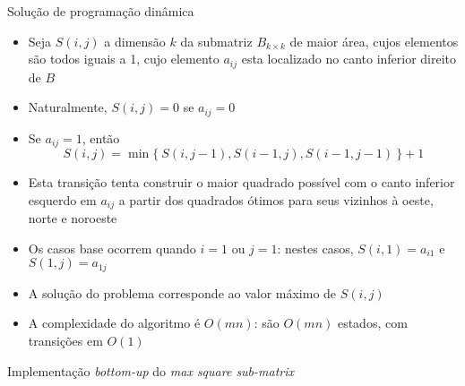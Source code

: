 \begin{frame}[fragile]{Solução de programação dinâmica}

    \begin{itemize}
        \item Seja $S(i, j)$ a dimensão $k$ da submatriz $B_{k\times k}$ de maior área, cujos
            elementos são todos iguais a 1, cujo elemento $a_{ij}$ esta localizado no canto
            inferior direito de $B$

        \item Naturalmente, $S(i, j) = 0$ se $a_{ij} = 0$

        \item Se $a_{ij} = 1$, então
        \[
            S(i, j) = \min\{\ S(i, j - 1), S(i - 1, j), S(i - 1, j - 1)\ \} + 1
        \]

        \item Esta transição tenta construir o maior quadrado possível com o canto inferior
            esquerdo em $a_{ij}$ a partir dos quadrados ótimos para seus vizinhos à oeste, 
            norte e noroeste

        \item Os casos base ocorrem quando $i = 1$ ou $j = 1$: nestes casos, $S(i, 1) = a_{i1}$ e
            $S(1, j) = a_{1j}$

        \item A solução do problema corresponde ao valor máximo de $S(i, j)$

        \item A complexidade do algoritmo é $O(mn)$: são $O(mn)$ estados, com transições em
            $O(1)$
    \end{itemize}

\end{frame}

\begin{frame}[fragile]{Implementação {\it bottom-up} do {\it max square sub-matrix}}
\end{frame}

